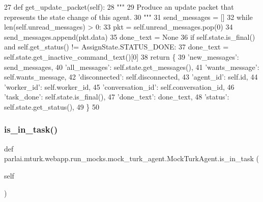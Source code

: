 \begin{DoxyCode}
27     \textcolor{keyword}{def }get\_update\_packet(self):
28         \textcolor{stringliteral}{"""}
29 \textcolor{stringliteral}{        Produce an update packet that represents the state change of this agent.}
30 \textcolor{stringliteral}{        """}
31         send\_messages = []
32         \textcolor{keywordflow}{while} len(self.unread\_messages) > 0:
33             pkt = self.unread\_messages.pop(0)
34             send\_messages.append(pkt.data)
35         done\_text = \textcolor{keywordtype}{None}
36         \textcolor{keywordflow}{if} self.state.is\_final() \textcolor{keywordflow}{and} self.get\_status() != AssignState.STATUS\_DONE:
37             done\_text = self.state.get\_inactive\_command\_text()[0]
38         \textcolor{keywordflow}{return} \{
39             \textcolor{stringliteral}{'new\_messages'}: send\_messages,
40             \textcolor{stringliteral}{'all\_messages'}: self.state.get\_messages(),
41             \textcolor{stringliteral}{'wants\_message'}: self.wants\_message,
42             \textcolor{stringliteral}{'disconnected'}: self.disconnected,
43             \textcolor{stringliteral}{'agent\_id'}: self.id,
44             \textcolor{stringliteral}{'worker\_id'}: self.worker\_id,
45             \textcolor{stringliteral}{'conversation\_id'}: self.conversation\_id,
46             \textcolor{stringliteral}{'task\_done'}: self.state.is\_final(),
47             \textcolor{stringliteral}{'done\_text'}: done\_text,
48             \textcolor{stringliteral}{'status'}: self.state.get\_status(),
49         \}
50 
\end{DoxyCode}
\mbox{\label{classparlai_1_1mturk_1_1webapp_1_1run__mocks_1_1mock__turk__agent_1_1MockTurkAgent_aafcf8fb590eb73fbd5bafa4122a56604}} 
\subsubsection{\texorpdfstring{is\+\_\+in\+\_\+task()}{is\_in\_task()}}
{\footnotesize\ttfamily def parlai.\+mturk.\+webapp.\+run\+\_\+mocks.\+mock\+\_\+turk\+\_\+agent.\+Mock\+Turk\+Agent.\+is\+\_\+in\+\_\+task (\begin{DoxyParamCaption}\item[{}]{self }\end{DoxyParamCaption})}



